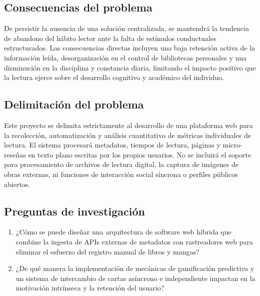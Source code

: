 \documentclass[12pt, atypical, journal]{article}
\begin{document}
\subsection{Consecuencias del problema}
De persistir la ausencia de una solución centralizada, se mantendrá la tendencia de abandono del hábito lector ante la falta de estímulos conductuales estructurados. Las consecuencias directas incluyen una baja retención activa de la información leída, desorganización en el control de bibliotecas personales y una disminución en la disciplina y constancia diaria, limitando el impacto positivo que la lectura ejerce sobre el desarrollo cognitivo y académico del individuo.

\subsection{Delimitación del problema}
Este proyecto se delimita estrictamente al desarrollo de una plataforma web para la recolección, automatización y análisis cuantitativo de métricas individuales de lectura. El sistema procesará metadatos, tiempos de lectura, páginas y micro-reseñas en texto plano escritas por los propios usuarios. No se incluirá el soporte para procesamiento de archivos de lectura digital, la captura de imágenes de obras externas, ni funciones de interacción social síncrona o perfiles públicos abiertos.

\subsection{Preguntas de investigación}
\begin{enumerate}
   \item ¿Cómo se puede diseñar una arquitectura de software web híbrida que combine la ingesta de APIs externas de metadatos con rastreadores web para eliminar el esfuerzo del registro manual de libros y mangas?
   \item ¿De qué manera la implementación de mecánicas de gamificación predictiva y un sistema de intercambio de cartas asíncrono e independiente impactan en la motivación intrínseca y la retención del usuario?
\end{enumerate}
\end{document}
